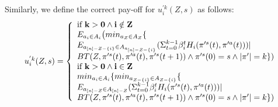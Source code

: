 Similarly, we define the correct pay-off for $u_i^{'k}(Z,s)$ as follows:
%
%
\[
\begin{array}{l}
u_{i}^{'k}(Z,s)=
\left\{
\begin{array}{l}
{\bf \text{if } k > 0 \wedge i \notin Z}  \\
E_{a_i \in A_i} \big(
min _{a_{Z} \in A_{Z}}\{
\\E_{a_{[n]-Z-\{i\}} \in A_{a_{[n]-Z-\{i\}}}} (\Sigma_{t=0}^{k-1} \beta_i^{t}H_{i}(\pi'^{s}(t),\pi'^{a}(t))) |\\ BT(Z,\pi'^{s}(t),\pi'^{a}(t),\pi'^{s}(t+1)) \wedge \pi'^{s}(0)=s \wedge |\pi'|=k\})\\
{\bf \text{if } k > 0 \wedge i \in Z} \\
min _{a_i \in A_i} \{
min_{a_{Z-\{i\}} \in A_{Z-\{i\}}}\{
\\E_{a_{[n]-Z} \in A_{[n]-Z}} (\Sigma_{t=0}^{k-1} \beta_i^{t}H_{i}(\pi'^{s}(t),\pi'^{a}(t))) |\\ BT(Z,\pi'^{s}(t),\pi'^{a}(t),\pi'^{s}(t+1)) \wedge \pi'^{s}(0)=s \wedge |\pi'|=k\})\\
\end{array}
\right.
\end{array}
\]


